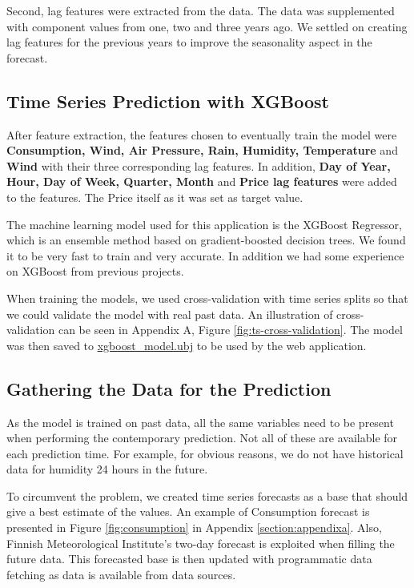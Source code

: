 \documentclass{article}
\begin{document}
Second, lag features were extracted from the data. The data was supplemented with component values from one, two and three years ago. We settled on creating lag features for the previous years to improve the seasonality aspect in the forecast.

\subsection{Time Series Prediction with XGBoost}
\label{subsection:xgboost}

After feature extraction, the features chosen to eventually train the model were \textbf{Consumption, Wind, Air Pressure, Rain, Humidity, Temperature} and \textbf{Wind} with their three corresponding lag features. In addition, \textbf{Day of Year, Hour, Day of Week, Quarter, Month} and \textbf{Price lag features} were added to the features. The Price itself as it was set as target value.

The machine learning model used for this application is the XGBoost Regressor, which is an ensemble method based on gradient-boosted decision trees. We found it to be very fast to train and very accurate. In addition we had some experience on XGBoost from previous projects. 

When training the models, we used cross-validation with time series splits so that we could validate the model with real past data. An illustration of cross-validation can be seen in Appendix A, Figure \ref{fig:ts-cross-validation}. The model was then saved to \href{https://github.com/IDS-mini/electricity/blob/main/models/xgboost_model.ubj}{xgboost\_model.ubj} to be used by the web application.

\subsection{Gathering the Data for the Prediction}
\label{subsection:datafilling}

As the model is trained on past data, all the same variables need to be present when performing the contemporary prediction. Not all of these are available for each prediction time. For example, for obvious reasons, we do not have historical data for humidity 24 hours in the future.

To circumvent the problem, we created time series forecasts as a base that should give a best estimate of the values. An example of Consumption forecast is presented in Figure \ref{fig:consumption} in Appendix \ref{section:appendixa}. Also, Finnish Meteorological Institute's two-day forecast is exploited when filling the future data. This forecasted base is then updated with programmatic data fetching as data is available from data sources.
\end{document}

